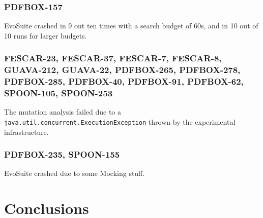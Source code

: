 \documentclass[sigconf]{acmart}
\newcommand{\EVOSUITE}{{\sc EvoSuite}\xspace}
\begin{document}
\subsubsection*{PDFBOX-157} \EVOSUITE crashed in 9 out ten times with a search budget of 60s, and in 10 out of 10 runs for larger budgets. 


\subsubsection*{FESCAR-23, FESCAR-37, FESCAR-7, FESCAR-8, GUAVA-212, GUAVA-22, PDFBOX-265, PDFBOX-278, PDFBOX-285, PDFBOX-40, PDFBOX-91, PDFBOX-62, SPOON-105, SPOON-253} The mutation analysis
failed due to a \texttt{java.util.concurrent.ExecutionException} thrown by the
experimental infrastructure.


\subsubsection*{PDFBOX-235, SPOON-155} \EVOSUITE crashed due to some Mocking stuff.


\section{Conclusions}

\balance


\end{document}
